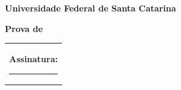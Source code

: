 \documentclass[10pt,a4paper]{article}
\makeatletter
\newcommand{\myCourse}{\@Course}
\newcommand{\mySemester}{\@Semester}
\newcommand{\myID}{\@ID}
\makeatother
\begin{document}
\thispagestyle{empty}
{\sf
\textbf{\LARGE{Universidade Federal de Santa Catarina}}

\textbf{\large{Prova de \myCourse \: \mySemester \hfill \myID}}

\vspace*{1cm}

\begin{tabular}{p{14cm}}
\textbf{Assinatura:} \hrule
\end{tabular}
}

\begin{enumerate}
\end{enumerate}
\end{document}
